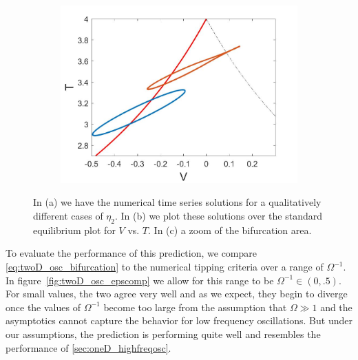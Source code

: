 \begin{figure}[H]
\begin{subfigure}{.5\textwidth}
  \includegraphics[width=\linewidth]{twoD/osc_bif_Tplot_zoom.jpg}
  \caption{}
\end{subfigure}
\caption{In (a) we have the numerical time series solutions for a qualitatively different cases of $\eta_2$. In (b) we plot these solutions over the standard equilibrium plot for $V$ vs. $T$. In (c) a zoom of the bifurcation area.}
\label{fig:twoD_osc_Tnumerics}
\end{figure}

To evaluate the performance of this prediction, we compare \eqref{eq:twoD_osc_bifurcation} to the numerical tipping criteria over a range of $\Omega^{-1}$. In figure~\ref{fig:twoD_osc_epscomp} we allow for this range to be $\Omega^{-1}\in (0,.5)$. For small values, the two agree very well and as we expect, they begin to diverge once the values of $\Omega^{-1}$ become too large from the assumption that $\Omega\gg 1$ and the asymptotics cannot capture the behavior for low frequency oscillations. But under our assumptions, the prediction is performing quite well and resembles the performance of \autoref{sec:oneD_highfreqosc}.

